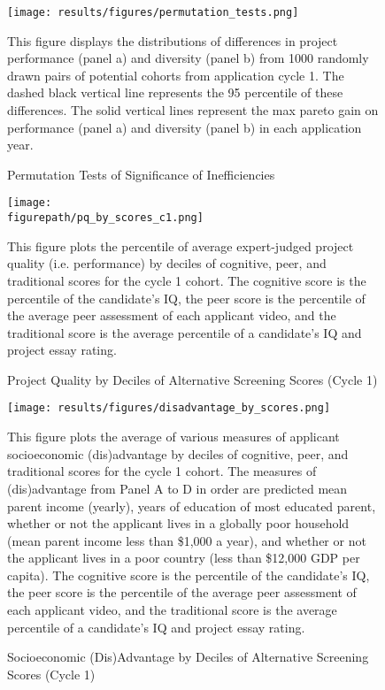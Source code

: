     
    \newpage
    \begin{figure}[!htb]
    \centering
        \caption{Permutation Tests of Significance of Inefficiencies} \label{fig:permutation_tests}
      \texttt{[image: results/figures/permutation\_tests.png]} 
        \begin{notes}
        This figure displays the distributions of differences in project performance (panel a) and diversity (panel b) from 1000 randomly drawn pairs of potential cohorts from application cycle 1. The dashed black vertical line represents the 95 percentile of these differences. The solid vertical lines represent the max pareto gain on performance (panel a) and diversity (panel b) in each application year.
        \end{notes}
    \end{figure}
    
    \newpage
    \begin{figure}[!htb]
    \centering
        \caption{Project Quality by Deciles of Alternative Screening Scores (Cycle 1)} \label{fig:alt_talent_dist}
      \texttt{[image: \\figurepath/pq\_by\_scores\_c1.png]} 
        \begin{notes}
        This figure plots the percentile of average expert-judged project quality (i.e. performance) by deciles of cognitive, peer, and traditional scores for the cycle 1 cohort. The cognitive score is the percentile of the candidate's IQ, the peer score is the percentile of the average peer assessment of each applicant video, and the traditional score is the average percentile of a candidate's IQ and project essay rating.   
        \end{notes}
    \end{figure}
    
    \newpage
    \begin{figure}[!htb]
    \centering
        \caption{Socioeconomic (Dis)Advantage by Deciles of Alternative Screening Scores (Cycle 1)} \label{fig:disadvantage_corr}
      \texttt{[image: results/figures/disadvantage\_by\_scores.png]} 
        \begin{notes}
        This figure plots the average of various measures of applicant socioeconomic (dis)advantage by deciles of cognitive, peer, and traditional scores for the cycle 1 cohort. The measures of (dis)advantage from Panel A to D in order are predicted mean parent income (yearly), years of education of most educated parent, whether or not the applicant lives in a globally poor household (mean parent income less than \$1,000 a year), and whether or not the applicant lives in a poor country (less than \$12,000 GDP per capita). The cognitive score is the percentile of the candidate's IQ, the peer score is the percentile of the average peer assessment of each applicant video, and the traditional score is the average percentile of a candidate's IQ and project essay rating.   
        \end{notes}
    \end{figure}
    
